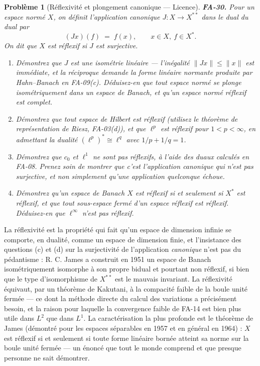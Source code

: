 \documentclass[11pt]{article}
\newtheorem{problem}{Problème}
\begin{document}
\bigskip

\begin{problem}[{Réflexivité et plongement canonique --- Licence}]
\textbf{FA-30.} Pour un espace normé $ X $, on définit l'\textit{application canonique}
$ J : X \to X^{**} $ dans le dual du dual par
\[ (Jx)(f) \;=\; f(x), \qquad x \in X,\ f \in X^{*} . \]
On dit que $ X $ est \textit{réflexif} si $ J $ est surjective.
\begin{enumerate}
\item[(a)] Démontrez que $ J $ est une isométrie linéaire --- l'inégalité $ \|Jx\| \le \|x\| $ est
immédiate, et la réciproque demande la forme linéaire normante produite par Hahn--Banach en FA-09(c).
Déduisez-en que tout espace normé se plonge isométriquement dans un espace de Banach, et qu'un espace
normé réflexif est complet.
\item[(b)] Démontrez que tout espace de Hilbert est réflexif (utilisez le théorème de représentation de
Riesz, FA-03(d)), et que $ \ell^p $ est réflexif pour $ 1 < p < \infty $, en admettant la
dualité $ (\ell^p)^{*} \cong \ell^q $ avec $ 1/p + 1/q = 1 $.
\item[(c)] Démontrez que $ c_0 $ et $ \ell^1 $ ne sont pas réflexifs, à l'aide des duaux calculés en
FA-08. Prenez soin de montrer que c'est l'application \textit{canonique} qui n'est pas surjective, et
non simplement qu'une application quelconque échoue.
\item[(d)] Démontrez qu'un espace de Banach $ X $ est réflexif si et seulement si $ X^{*} $ est
réflexif, et que tout sous-espace fermé d'un espace réflexif est réflexif. Déduisez-en que
$ \ell^\infty $ n'est pas réflexif.
\end{enumerate}

\end{problem}

\noindent La réflexivité est la propriété qui fait qu'un espace de dimension infinie se comporte,
en dualité, comme un espace de dimension finie, et l'insistance des questions (c) et (d) sur la
surjectivité de l'application \textit{canonique} n'est pas du pédantisme : R. C. James a construit en 1951
un espace de Banach isométriquement isomorphe à son propre bidual et pourtant non réflexif, si bien que
le type d'isomorphisme de $ X^{**} $ est le mauvais invariant. La réflexivité équivaut, par un théorème
de Kakutani, à la compacité faible de la boule unité fermée --- ce dont la méthode directe du calcul des
variations a précisément besoin, et la raison pour laquelle la convergence faible de FA-14 est bien plus
utile dans $ L^2 $ que dans $ L^1 $. La caractérisation la plus profonde est le théorème de James
(démontré pour les espaces séparables en 1957 et en général en 1964) : $ X $ est réflexif si et
seulement si toute forme linéaire bornée atteint sa norme sur la boule unité fermée --- un énoncé que tout
le monde comprend et que presque personne ne sait démontrer.
\end{document}
